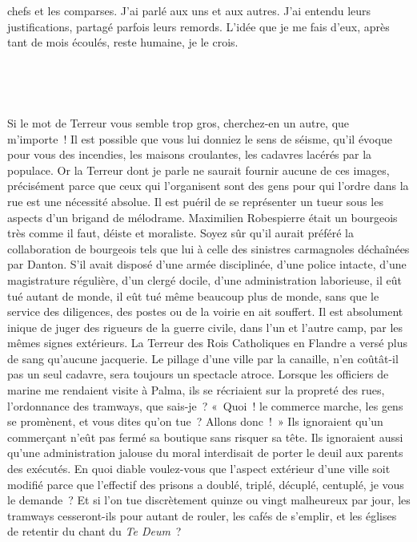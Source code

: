 \documentclass[french,twoside]{book} %
\newcommand{\astertri}{\medskip\par\centerline{\color{rubric}\large\selectfont{\syms ✻\,✻\,✻}}\medskip\par}%
\begin{document}
chefs et les comparses. J’ai parlé aux uns et aux autres. J’ai entendu leurs justifications, partagé parfois leurs remords. L’idée que je me fais d’eux, après tant de mois écoulés, reste humaine, je le crois.\par
 \par

\astertri

\noindent  \par
Si le mot de Terreur vous semble trop gros, cherchez-en un autre, que m’importe ! Il est possible que vous lui donniez le sens de séisme, qu’il évoque pour vous des incendies, les maisons croulantes, les cadavres lacérés par la populace. Or la Terreur dont je parle ne saurait fournir aucune de ces images, précisément parce que ceux qui l’organisent sont des gens pour qui l’ordre dans la rue est une nécessité absolue. Il est puéril de se représenter un tueur sous les aspects d’un brigand de mélodrame. Maximilien Robespierre était un bourgeois très comme il faut, déiste et moraliste. Soyez sûr qu’il aurait préféré la collaboration de bourgeois tels que lui à celle des sinistres carmagnoles déchaînées par Danton. S’il avait disposé d’une armée disciplinée, d’une police intacte, d’une magistrature régulière, d’un clergé docile, d’une administration laborieuse, il eût tué autant de monde, il eût tué même beaucoup plus de monde, sans que le service des diligences, des postes ou de la voirie en ait souffert. Il est absolument inique de juger des rigueurs de la guerre civile, dans l’un et l’autre camp, par les mêmes signes extérieurs. La Terreur des Rois Catholiques en Flandre a versé plus de sang qu’aucune jacquerie. Le pillage d’une ville par la canaille, n’en coûtât-il pas un seul cadavre, sera toujours un spectacle atroce. Lorsque les officiers de marine me rendaient visite à Palma, ils se récriaient sur la propreté des rues, l’ordonnance des tramways, que sais-je ? « Quoi ! le commerce marche, les gens se promènent, et vous dites qu’on tue ? Allons donc ! » Ils ignoraient qu’un commerçant n’eût pas fermé sa boutique sans risquer sa tête. Ils ignoraient aussi qu’une administration jalouse du moral interdisait de porter le deuil aux parents des exécutés. En quoi diable voulez-vous que l’aspect extérieur d’une ville soit modifié parce que l’effectif des prisons a doublé, triplé, décuplé, centuplé, je vous le demande ? Et si l’on tue discrètement quinze ou vingt malheureux par jour, les tramways cesseront-ils pour autant de rouler, les cafés de s’emplir, et les églises de retentir du chant du \emph{Te Deum} ?\par
\end{document}

